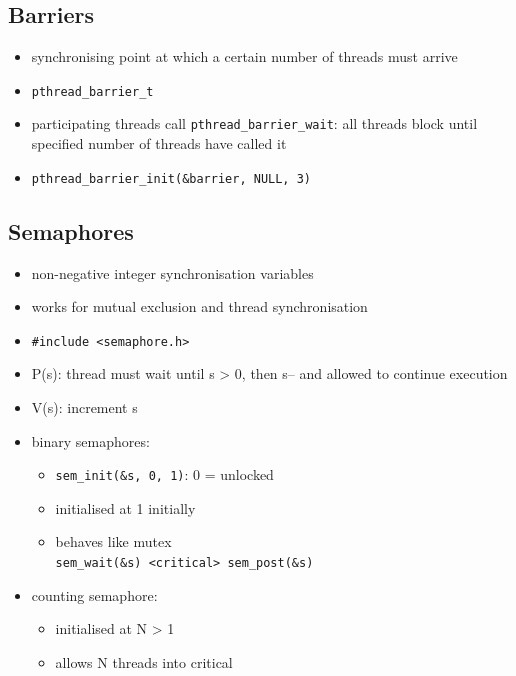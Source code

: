 \documentclass[10pt, multicolumn, a4paper]{article}
\begin{document}
\begin{multicols}{2}
	\subsection*{Barriers}
	\begin{itemize}
	\item synchronising point at which a certain number of threads must arrive 
	\item \verb|pthread_barrier_t|
	\item participating threads call \verb|pthread_barrier_wait|: all threads block until specified number of threads have called it
	\item \verb|pthread_barrier_init(&barrier, NULL, 3)|
	\end{itemize}
	\subsection*{Semaphores}
	\begin{itemize}
	\item non-negative integer synchronisation variables
	\item works for mutual exclusion and thread synchronisation
	\item \verb|#include <semaphore.h>|
	\item P(s): thread must wait until s > 0, then s-- and allowed to continue execution 
	\item V(s): increment s
	\item binary semaphores: 
		\begin{itemize}
		\item \verb|sem_init(&s, 0, 1)|: 0 = unlocked
		\item initialised at 1 initially
		\item behaves like mutex \\ \verb|sem_wait(&s) <critical> sem_post(&s)|
		\end{itemize}
	\item counting semaphore:
		\begin{itemize}
		\item initialised at N > 1
		\item allows N threads into critical
		\end{itemize}
	\end{itemize}

\end{multicols}
\end{document}
